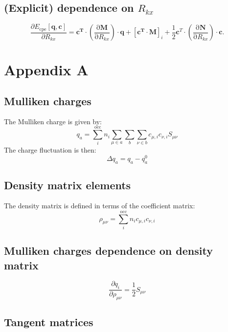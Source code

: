 \documentclass{article}
\numberwithin{equation}{section}
\begin{document}
\subsection{(Explicit) dependence on $R_{kx}$}

\begin{equation}
    \frac{\partial E_\mathrm{{cpe}}\left[\mathbf{q}, \mathbf{c}\right]}{\partial R_{kx}} = 
    \mathbf{c^T} \cdot \left( \frac{\mathrm{\partial}\mathbf{M}}{\mathrm{\partial}R_{kx}}\right) \cdot \mathbf{q} 
    + [\mathbf{c^T}  \cdot \mathbf{M}]_i + \frac{1}{2}\mathbf{c}^T \cdot \left( \frac{\mathrm{\partial}\mathbf{N}}{\mathrm{\partial}R_{kx}}\right) \cdot \mathbf{c}. 
\end{equation}







\appendix
\section{Appendix A}
\subsection{Mulliken charges}
The Mulliken charge is given by:
\begin{equation}
    q_a = \sum_i^\mathrm{occ} n_i \sum_{\mu \in a} \sum_b \sum_{\nu \in b}
    c_{\mu,i} c_{\nu,i} S_{\mu\nu}
\end{equation}
The charge fluctuation is then: 
\begin{equation}
    \Delta q_a = q_a - q_a^0
\end{equation}
\subsection{Density matrix elements}
The density matrix is defined in terms of the coefficient matrix:
\begin{equation}
    \rho_{\mu\nu} = \sum_i^\mathrm{occ} n_i c_{\mu,i} c_{\nu,i}
\end{equation}
\subsection{Mulliken charges dependence on density matrix}

\begin{equation}
    \frac{\partial q_i}{\partial \rho_{\mu\nu}} = \frac{1}{2} S_{\mu\nu}
\end{equation}
\subsection{Tangent matrices}
\end{document}
